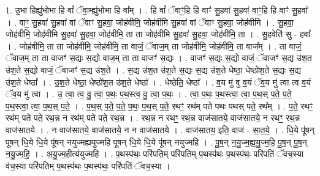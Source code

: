 \documentclass[17pt]{extarticle}
\begin{document}
1. उ॒भा हिह्यु॑भोभा हि वां᳚ ॅवा॒म्ह्यु॑भोभा हि वा᳚म् । . हि वां᳚ ॅवाꣳ॒॒हि हि वाꣳ॑ सु॒हवा॑ सु॒हवा॑ वाꣳ॒॒हि हि वाꣳ॑ सु॒हवा᳚ । . वाꣳ॒॒ सु॒हवा॑ सु॒हवा॑ वां ॅवाꣳ सु॒हवा॒ जोह॑वीमि॒ जोह॑वीमि सु॒हवा॑ वां ॅवाꣳ सु॒हवा॒ जोह॑वीमि । . सु॒हवा॒ जोह॑वीमि॒ जोह॑वीमि सु॒हवा॑ सु॒हवा॒ जोह॑वीमि॒ ता ता जोह॑वीमि सु॒हवा॑ सु॒हवा॒ जोह॑वीमि॒ ता । . सु॒हवेति॑ सु - हवा᳚ । . जोह॑वीमि॒ ता ता जोह॑वीमि॒ जोह॑वीमि॒ ता वाजं॒ ॅवाज॒म् ता जोह॑वीमि॒ जोह॑वीमि॒ ता वाज᳚म् । . ता वाजं॒ ॅवाज॒म् ता ता वाजꣳ॑ स॒द्यः स॒द्यो वाज॒म् ता ता वाजꣳ॑ स॒द्यः । . वाजꣳ॑ स॒द्यः स॒द्यो वाजं॒ ॅवाजꣳ॑ स॒द्य उ॑श॒त उ॑श॒ते स॒द्यो वाजं॒ ॅवाजꣳ॑ स॒द्य उ॑श॒ते । . स॒द्य उ॑श॒त उ॑श॒ते स॒द्यः स॒द्य उ॑श॒ते धेष्ठा॒ धेष्ठो॑श॒ते स॒द्यः स॒द्य उ॑श॒ते धेष्ठा᳚ । . उ॒श॒ते धेष्ठा॒ धेष्ठो॑श॒त उ॑श॒ते धेष्ठा᳚ । . धेष्ठेति॒ धेष्ठा᳚ । . व॒य मु॑ वु व॒यं ॅव॒य मु॑ त्वा त्व व॒यं ॅव॒य मु॑ त्वा । . उ॒ त्वा॒ त्व॒ वु॒ त्वा॒ प॒थः॒ प॒थ॒स्त्व॒ वु॒ त्वा॒ प॒थः॒ । . त्वा॒ प॒थः॒ प॒थ॒स्त्वा॒ त्वा॒ प॒थ॒स् प॒ते॒ प॒ते॒ प॒थ॒स्त्वा॒ त्वा॒ प॒थ॒स् प॒ते॒ । . प॒थ॒स् प॒ते॒ प॒ते॒ प॒थः॒ प॒थ॒स् प॒ते॒ रथꣳ॒॒ रथ॑म् पते पथः पथस् पते॒ रथ᳚म् । . प॒ते॒ रथꣳ॒॒ रथ॑म् पते पते॒ रथ॒न्न न रथ॑म् पते पते॒ रथ॒न्न । . रथ॒न्न न रथꣳ॒॒ रथ॒न्न वाज॑सातये॒ वाज॑सातये॒ न रथꣳ॒॒ रथ॒न्न वाज॑सातये । . न वाज॑सातये॒ वाज॑सातये॒ न न वाज॑सातये । . वाज॑सातय॒ इति॒ वाज॑ - सा॒त॒ये॒ । . धि॒ये पू॑षन् पूषन् धि॒ये धि॒ये पू॑षन् नयुज्मह्ययुज्महि पूषन् धि॒ये धि॒ये पू॑षन् नयुज्महि । . पू॒ष॒न् न॒यु॒ज्म॒ह्य॒यु॒ज्म॒हि॒ पू॒ष॒न् पू॒ष॒न् न॒यु॒ज्म॒हि॒ । . अ॒यु॒ज्म॒हीत्य॑युज्महि । . प॒थस्प॑थः॒ परि॑पति॒म् परि॑पतिम् प॒थस्प॑थः प॒थस्प॑थः॒ परि॑पतिं ॅवच॒स्या व॑च॒स्या परि॑पतिम् प॒थस्प॑थः प॒थस्प॑थः॒ परि॑पतिं ॅवच॒स्या । \newline
\end{document}
